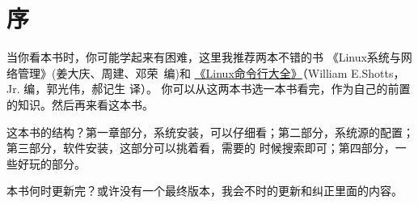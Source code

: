 \chapter{序}

当你看本书时，你可能学起来有困难，这里我推荐两本不错的书 《Linux系统与网络管理》(姜大庆、周建、邓荣~编)和 
\href{https://item.jd.com/11196146.html}{《Linux命令行大全》}（William E.Shotts，Jr. 编，郭光伟，郝记生 译）。
你可以从这两本书选一本书看完，作为自己的前置的知识。然后再来看这本书。


这本书的结构？第一章部分，系统安装，可以仔细看；第二部分，系统源的配置；第三部分，软件安装，这部分可以挑着看，需要的
时候搜索即可；第四部分，一些好玩的部分。

本书何时更新完？或许没有一个最终版本，我会不时的更新和纠正里面的内容。
